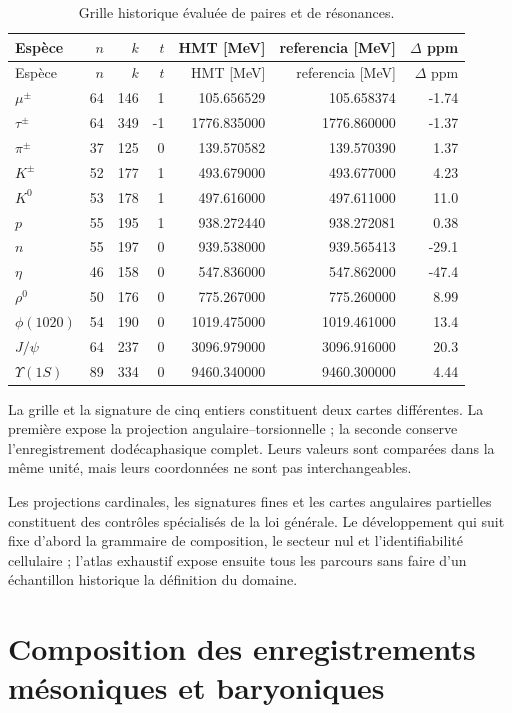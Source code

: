 \begin{longtable}{@{}lrrrrrr@{}}
\caption{Grille historique évaluée de paires et de résonances.}
\label{tab:rejilla-extendida-resonancias-rev6}\\
\toprule
Espèce&\(n\)&\(k\)&\(t\)&{HMT [MeV]}&{referencia [MeV]}&{\(\Delta\) ppm}\\
\midrule
\endfirsthead
\toprule
Espèce&\(n\)&\(k\)&\(t\)&{HMT [MeV]}&{referencia [MeV]}&{\(\Delta\) ppm}\\
\midrule
\endhead
\(\mu^\pm\)&64&146&1&105.656529&105.658374&-1.74\\
\(\tau^\pm\)&64&349&-1&1776.835000&1776.860000&-1.37\\
\(\pi^\pm\)&37&125&0&139.570582&139.570390&1.37\\
\(K^\pm\)&52&177&1&493.679000&493.677000&4.23\\
\(K^0\)&53&178&1&497.616000&497.611000&11.0\\
\(p\)&55&195&1&938.272440&938.272081&0.38\\
\(n\)&55&197&0&939.538000&939.565413&-29.1\\
\(\eta\)&46&158&0&547.836000&547.862000&-47.4\\
\(\rho^0\)&50&176&0&775.267000&775.260000&8.99\\
\(\phi(1020)\)&54&190&0&1019.475000&1019.461000&13.4\\
\(J/\psi\)&64&237&0&3096.979000&3096.916000&20.3\\
\(\Upsilon(1S)\)&89&334&0&9460.340000&9460.300000&4.44\\
\bottomrule
\end{longtable}

La grille et la signature de cinq entiers constituent deux cartes différentes. La première
expose la projection angulaire--torsionnelle ; la seconde conserve l'enregistrement
dodécaphasique complet. Leurs valeurs sont comparées dans la même unité, mais leurs
coordonnées ne sont pas interchangeables.
\fi

Les projections cardinales, les signatures fines et les cartes angulaires partielles
constituent des contrôles spécialisés de la loi générale. Le développement qui suit fixe
d'abord la grammaire de composition, le secteur nul et l'identifiabilité
cellulaire ; l'atlas exhaustif expose ensuite tous les parcours sans faire d'un
échantillon historique la définition du domaine.

\section{Composition des enregistrements mésoniques et baryoniques}

